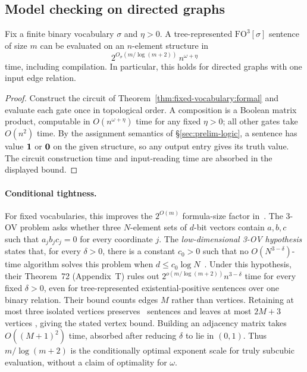 \subsection{Model checking on directed graphs}\label{sec:fixed-model-checking}
\begin{corollary}\label{cor:fixed-model-checking}
Fix a finite binary vocabulary $\sigma$ and $\eta>0$.
A tree-represented $\mathrm{FO}^3[\sigma]$ sentence of size $m$ can be
evaluated on an $n$-element structure in
\[
 2^{O_\sigma(m/\log(m+2))}\,n^{\omega+\eta}
\]
time, including compilation. In particular, this holds for directed
graphs with one input edge relation.
\end{corollary}
\begin{proof}
Construct the circuit of Theorem~\ref{thm:fixed-vocabulary:formal} and evaluate
each gate once in topological order.
A composition is a Boolean matrix product, computable in
$O(n^{\omega+\eta})$ time for any fixed $\eta>0$; all other gates take
$O(n^2)$ time. By the assignment semantics of \S\ref{sec:prelim-logic}, a
sentence has value $\mathbf{1}$ or $\mathbf{0}$ on the given structure, so any
output entry gives its truth value.
The circuit construction time and input-reading time are absorbed
in the displayed bound.
\end{proof}

\paragraph{Conditional tightness.}
For fixed vocabularies, this improves the $2^{O(m)}$ formula-size
factor in~\citep[Theorem~10]{nakamura-uezato2027}.
The 3-OV problem asks whether three $N$-element sets of $d$-bit vectors
contain $a,b,c$ such that $a_jb_jc_j=0$ for every coordinate $j$.
The \emph{low-dimensional 3-OV hypothesis} states that, for every
$\delta>0$, there is a constant $c_0>0$ such that no
$O(N^{3-\delta})$-time algorithm solves this problem when
$d\le c_0\log N$~\citep[Appendices to \S7.5]{nakamura-uezato2027}.
Under this hypothesis, their Theorem~72
(Appendix~T) rules out $2^{o(m/\log(m+2))}n^{3-\delta}$ time
for every fixed $\delta>0$, even for tree-represented
existential-positive sentences over one binary relation.
Their bound counts edges $M$ rather than vertices.
Retaining at most three isolated vertices preserves \FOthree\
sentences and leaves at most $2M+3$ vertices
\citep[Proposition~6]{nakamura-uezato2027}, giving the stated vertex
bound. Building an adjacency matrix takes $O((M+1)^2)$ time,
absorbed after reducing $\delta$ to lie in $(0,1)$.
Thus $m/\log(m+2)$ is the conditionally optimal exponent scale for
truly subcubic evaluation, without a claim of optimality for $\omega$.

